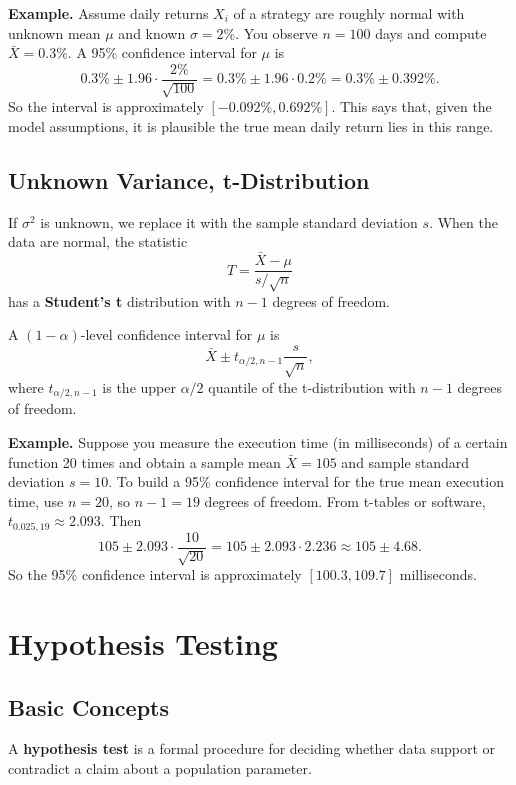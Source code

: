 \documentclass[11pt,a4paper]{article}
\begin{document}
\textbf{Example.}  
Assume daily returns \(X_i\) of a strategy are roughly normal with unknown mean \(\mu\) and known \(\sigma = 2\%\).  
You observe \(n=100\) days and compute \(\bar{X} = 0.3\%\).  
A 95\% confidence interval for \(\mu\) is
\[
0.3\% \pm 1.96 \cdot \frac{2\%}{\sqrt{100}}
= 0.3\% \pm 1.96 \cdot 0.2\%
= 0.3\% \pm 0.392\%.
\]
So the interval is approximately \([-0.092\%, 0.692\%]\).  
This says that, given the model assumptions, it is plausible the true mean daily return lies in this range.

\subsection{Unknown Variance, t-Distribution}

If \(\sigma^2\) is unknown, we replace it with the sample standard deviation \(s\).  
When the data are normal, the statistic
\[
T = \frac{\bar{X} - \mu}{s/\sqrt{n}}
\]
has a \textbf{Student's t} distribution with \(n-1\) degrees of freedom.

A \((1-\alpha)\)-level confidence interval for \(\mu\) is
\[
\bar{X} \pm t_{\alpha/2, n-1} \frac{s}{\sqrt{n}},
\]
where \(t_{\alpha/2, n-1}\) is the upper \(\alpha/2\) quantile of the t-distribution with \(n-1\) degrees of freedom.

\textbf{Example.}  
Suppose you measure the execution time (in milliseconds) of a certain function 20 times and obtain a sample mean \(\bar{X}=105\) and sample standard deviation \(s=10\).  
To build a 95\% confidence interval for the true mean execution time, use \(n=20\), so \(n-1=19\) degrees of freedom.  
From t-tables or software, \(t_{0.025,19} \approx 2.093\).  
Then
\[
105 \pm 2.093 \cdot \frac{10}{\sqrt{20}}
= 105 \pm 2.093 \cdot 2.236
\approx 105 \pm 4.68.
\]
So the 95\% confidence interval is approximately \([100.3, 109.7]\) milliseconds.

\newpage

\section{Hypothesis Testing}

\subsection{Basic Concepts}

A \textbf{hypothesis test} is a formal procedure for deciding whether data support or contradict a claim about a population parameter.
\end{document}
